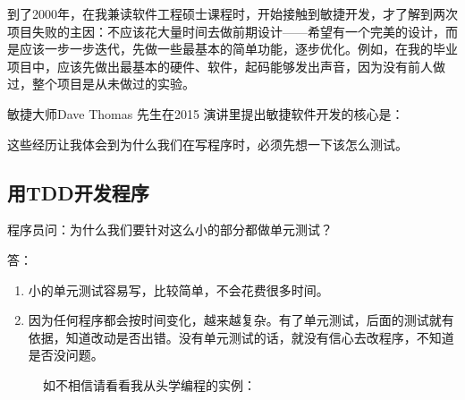 到了2000年，在我兼读软件工程硕士课程时，开始接触到敏捷开发，才了解到两次项目失败的主因：不应该花大量时间去做前期设计------希望有一个完美的设计，而是应该一步一步迭代，先做一些最基本的简单功能，逐步优化。例如，在我的毕业项目中，应该先做出最基本的硬件、软件，起码能够发出声音，因为没有前人做过，整个项目是从未做过的实验。

敏捷大师Dave Thomas 先生在2015 演讲里提出敏捷软件开发的核心是：



这些经历让我体会到为什么我们在写程序时，必须先想一下该怎么测试。

\hypertarget{ux7528tddux5f00ux53d1ux7a0bux5e8f}{%
\subsection{用TDD开发程序}\label{ux7528tddux5f00ux53d1ux7a0bux5e8f}}

程序员问：为什么我们要针对这么小的部分都做单元测试？

答：

\begin{enumerate}
\tightlist
\item
  小的单元测试容易写，比较简单，不会花费很多时间。
\item
  因为任何程序都会按时间变化，越来越复杂。有了单元测试，后面的测试就有依据，知道改动是否出错。没有单元测试的话，就没有信心去改程序，不知道是否没问题。
\end{enumerate}

\begin{description}
\item[]

如不相信请看看我从头学编程的实例：
\end{description}

